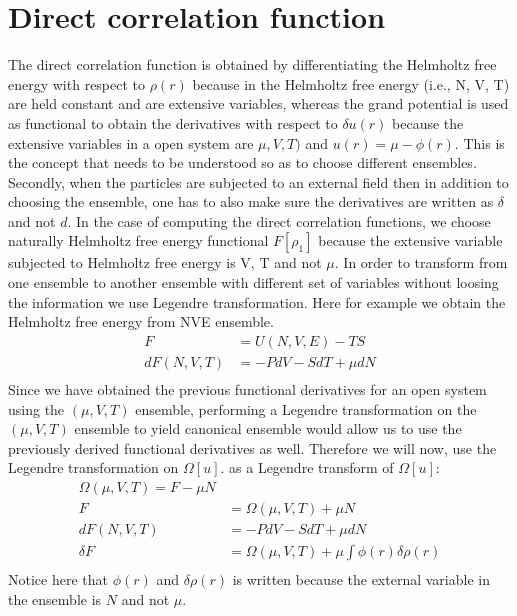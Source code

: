 \documentclass[a4paper]{article}
\begin{document}
\section{Direct correlation function}
The direct correlation function is obtained by differentiating the Helmholtz free energy with respect to $\rho(r)$ because in the Helmholtz free energy (i.e., N, V, T) are held constant and are extensive variables, whereas the grand potential is used as functional to obtain the derivatives with respect to $\delta u(r)$ because the extensive variables in a open system are $\mu, V, T)$ and $u(r) = \mu - \phi(r)$. This is the concept that needs to be understood so as to choose different ensembles. Secondly, when the particles are subjected to an external field then in addition to choosing the ensemble, one has to also make sure the derivatives are written as $\delta$ and not $d$.
In the case of computing the direct correlation functions, we choose naturally Helmholtz free energy functional $F[\rho_1]$ because the extensive variable subjected to Helmholtz free energy is V, T and not $\mu$. In order to transform from one ensemble to another ensemble with different set of variables without loosing the information we use Legendre transformation. Here for example we obtain the Helmholtz free energy  from NVE ensemble.
\begin{align}
	F &= U(N,V,E) - TS\\
	dF(N,V,T) &= -PdV - SdT + \mu dN\\
\end{align}
Since we have obtained the previous functional derivatives for an open system using the $(\mu, V, T)$ ensemble, performing a Legendre transformation on the $(\mu, V, T)$ ensemble to yield canonical ensemble would allow us to use the previously derived functional derivatives as well. Therefore we will now, use the Legendre transformation on $\Omega[u]$.
as a Legendre transform of $\Omega[u]$:
\begin{align}
	\Omega(\mu,V,T) =  F - \mu N\\
	F &= \Omega(\mu,V,T) + \mu N\\
	dF(N,V,T) &= -PdV - SdT + \mu dN\\
	\delta F &= \Omega(\mu,V,T) + \mu \int \phi(r) \delta\rho(r)\\
\end{align}
Notice here that $\phi(r)$ and $\delta\rho(r)$ is written because the external variable in the ensemble is $N$ and not $\mu$.
\end{document}
